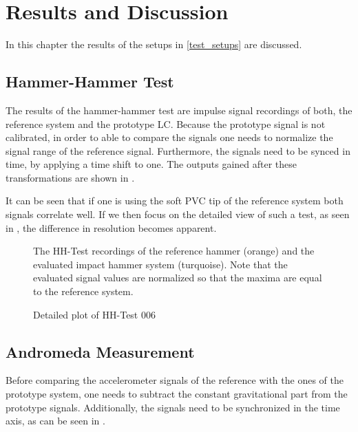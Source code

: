 \chapter{Results and Discussion}
\label{chp:results}

In this chapter the results of the setups in \autoref{test_setups} are discussed.

\section{Hammer-Hammer Test}

The results of the hammer-hammer test are impulse signal recordings of both, the reference system and the prototype \ac{LC}. Because the prototype signal is not calibrated, in order to able to compare the signals one needs to normalize the signal range of the reference signal. Furthermore, the signals need to be synced in time, by applying a time shift to one. The outputs gained after these transformations are shown in .

It can be seen that if one is using the soft PVC tip of the reference system both signals correlate well. If we then focus on the detailed view of such a test, as seen in , the difference in resolution becomes apparent.

\begin{figure}[!htb]
    \centering
    
    \caption[HH-Test comparison]{The HH-Test recordings of the reference hammer (orange) and the evaluated impact hammer system (turquoise). Note that the evaluated signal values are normalized so that the maxima are equal to the reference system.}
    \label{fig:HH_comparison}
\end{figure}
\begin{figure}[!htb]
    \centering
    
    \caption[HH006 Plot]{Detailed plot of HH-Test 006 }
    \label{fig:HH_noise}
\end{figure}

\section{Andromeda Measurement}
Before comparing the accelerometer signals of the reference with the ones of the prototype system, one needs to subtract the constant gravitational part from the prototype signals. Additionally, the signals need to be synchronized in the time axis, as can be seen in .

